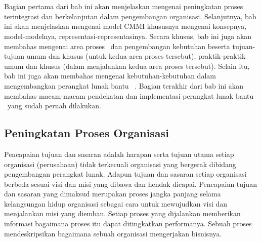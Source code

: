 \chapter{\babDua}
Bagian pertama dari bab ini akan menjelaskan mengenai peningkatan proses terintegrasi dan berkelanjutan dalam pengembangan organisasi. Selanjutnya, bab ini akan menjelaskan mengenai model CMMI khususnya mengenai konsepnya, model-modelnya, representasi-representasinya. Secara khusus, bab ini juga akan membahas mengenai area proses \mkeb~dan pengembangan kebutuhan beserta tujuan-tujuan umum dan khusus (untuk kedua area proses tersebut), praktik-praktik umum dan khusus (dalam menjalankan kedua area proses tersebut). Selain itu, bab ini juga akan membahas mengenai kebutuhan-kebutuhan dalam mengembangkan perangkat lunak bantu \mkeb~. Bagian terakhir dari bab ini akan membahas macam-macam pendekatan dan implementasi perangkat lunak bantu \mkeb~yang sudah pernah dilakukan.

\section{Peningkatan Proses Organisasi}
Pencapaian tujuan dan sasaran adalah harapan serta tujuan utama setiap organisasi (perusahaan) tidak terkecuali organisasi yang bergerak dibidang pengembangan perangkat lunak. Adapun tujuan dan sasaran setiap organisasi berbeda sesuai visi dan misi yang dibawa dan hendak dicapai. Pencapaian tujuan dan sasaran yang dimaksud merupakan proses jangka panjang selama kelangsungan hidup organisasi sebagai cara untuk mewujudkan visi dan menjalankan misi yang diemban. Setiap proses yang dijalankan memberikan informasi bagaimana proses itu dapat ditingkatkan performanya. Sebuah proses mendeskripsikan bagaimana sebuah organisasi mengerjakan bisnisnya.

